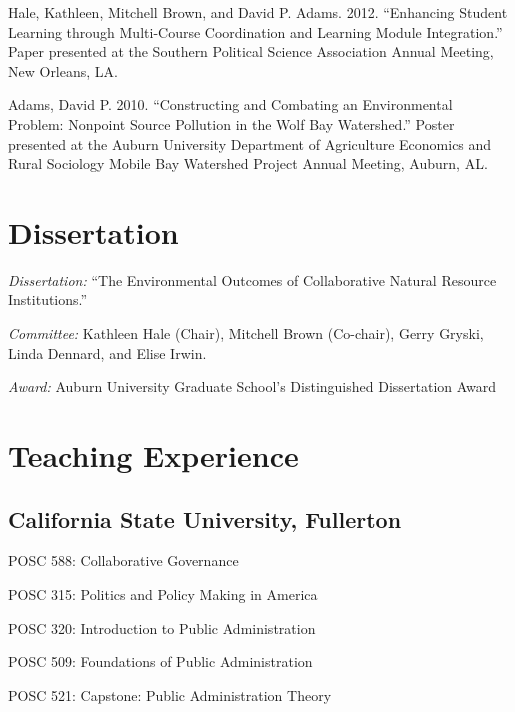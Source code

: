 \documentclass[12pt,letterpaper]{article}
\renewenvironment{itemize}{
  \begin{list}{}{
    \setlength{\leftmargin}{1.5em}
    \setlength{\itemsep}{0.25em}
    \setlength{\parskip}{0pt}
    \setlength{\parsep}{0.25em}
  }
}{
  \end{list}
}
\begin{document}
\begin{itemize}
    \item Hale, Kathleen, Mitchell Brown, and David P. Adams. 2012. ``Enhancing Student Learning through Multi-Course Coordination and Learning Module Integration.'' Paper presented at the Southern Political Science Association Annual Meeting, New Orleans, LA.
    
    \item Adams, David P. 2010. ``Constructing and Combating an Environmental Problem: Nonpoint Source Pollution in the Wolf Bay Watershed.'' Poster presented at the Auburn University Department of Agriculture Economics and Rural Sociology Mobile Bay Watershed Project Annual Meeting, Auburn, AL.
  \end{itemize}
  

\section*{Dissertation}
    \begin{itemize}\leftmargin=2pt\itemindent=-15pt\leftmargin=2pt\itemindent=-15pt
        \item \emph{Dissertation:} ``The Environmental Outcomes of Collaborative Natural Resource Institutions.'' 
        \item \emph{Committee:} Kathleen Hale (Chair), Mitchell Brown (Co-chair),
        Gerry Gryski, \\Linda Dennard, and Elise Irwin.
        \item \emph{Award:} Auburn University Graduate School's Distinguished Dissertation Award
    \end{itemize}
		
\section*{Teaching Experience}

\subsection*{California State University, Fullerton}
\begin{itemize}\leftmargin=2pt\itemindent=-15pt
  \item POSC 588: Collaborative Governance
  \item POSC 315: Politics and Policy Making in America
  \item POSC 320: Introduction to Public Administration
  \item POSC 509: Foundations of Public Administration
  \item POSC 521: Capstone: Public Administration Theory
\end{itemize}
\end{document}
